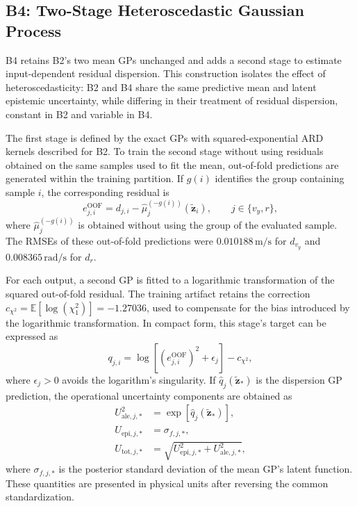 \documentclass[12pt,a4paper]{report}
\begin{document}
\subsection{B4: Two-Stage Heteroscedastic Gaussian Process}
\label{sec:modelo_b4}

B4 retains B2's two mean GPs unchanged and adds a second stage to estimate input-dependent residual dispersion. This construction isolates the effect of heteroscedasticity: B2 and B4 share the same predictive mean and latent epistemic uncertainty, while differing in their treatment of residual dispersion, constant in B2 and variable in B4.

The first stage is defined by the exact GPs with squared-exponential ARD kernels described for B2. To train the second stage without using residuals obtained on the same samples used to fit the mean, out-of-fold predictions are generated within the training partition. If $g(i)$ identifies the group containing sample $i$, the corresponding residual is
\begin{equation}
    e^{\mathrm{OOF}}_{j,i}
    =
    d_{j,i}
    -
    \hat{\mu}^{(-g(i))}_{j}(\tilde{\mathbf{z}}_i),
    \qquad j\in\{v_y,r\},
    \label{eq:b4_oof_residual}
\end{equation}
where $\hat{\mu}^{(-g(i))}_{j}$ is obtained without using the group of the evaluated sample. The RMSEs of these out-of-fold predictions were $0.010188\,\mathrm{m/s}$ for $d_{v_y}$ and $0.008365\,\mathrm{rad/s}$ for $d_r$.

For each output, a second GP is fitted to a logarithmic transformation of the squared out-of-fold residual. The training artifact retains the correction $c_{\chi^2}=\mathbb{E}[\log(\chi_1^2)]=-1.27036$, used to compensate for the bias introduced by the logarithmic transformation. In compact form, this stage's target can be expressed as
\begin{equation}
    q_{j,i}
    =
    \log\!\left[
        \left(e^{\mathrm{OOF}}_{j,i}\right)^2+\epsilon_j
    \right]
    -c_{\chi^2},
    \label{eq:b4_variance_target}
\end{equation}
where $\epsilon_j>0$ avoids the logarithm's singularity. If $\hat q_j(\tilde{\mathbf{z}}_*)$ is the dispersion GP prediction, the operational uncertainty components are obtained as
\begin{align}
    U^2_{\mathrm{ale},j,*}
    &=
    \exp\!\left[\hat q_j(\tilde{\mathbf{z}}_*)\right],
    \label{eq:b4_aleatoric}\\
    U_{\mathrm{epi},j,*}
    &=
    \sigma_{f,j,*},
    \label{eq:b4_epistemic}\\
    U_{\mathrm{tot},j,*}
    &=
    \sqrt{
        U^2_{\mathrm{epi},j,*}
        +
        U^2_{\mathrm{ale},j,*}
    },
    \label{eq:b4_total_uncertainty}
\end{align}
where $\sigma_{f,j,*}$ is the posterior standard deviation of the mean GP's latent function. These quantities are presented in physical units after reversing the common standardization.
\end{document}
